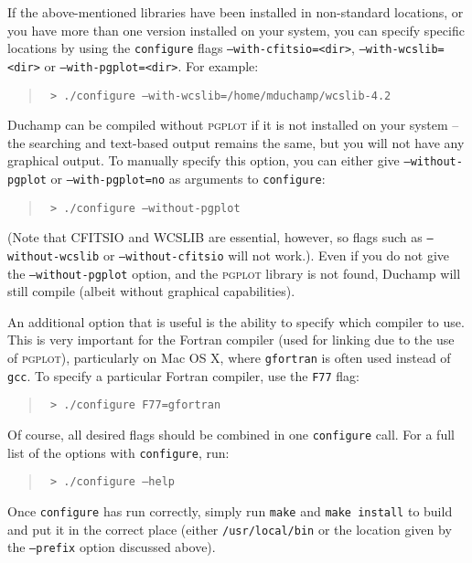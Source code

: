 If the above-mentioned libraries have been installed in non-standard
locations, or you have more than one version installed on your system,
you can specify specific locations by using the \texttt{configure} flags
\texttt{--with-cfitsio=<dir>}, \texttt{--with-wcslib=<dir>} or
\texttt{--with-pgplot=<dir>}. For example:
\begin{quote}
{\footnotesize
\texttt{%
> ./configure --with-wcslib=/home/mduchamp/wcslib-4.2}
}
\end{quote}

Duchamp can be compiled without \textsc{pgplot} if it is not installed
on your system -- the searching and text-based output remains the
same, but you will not have any graphical output.  To manually specify
this option, you can either give \texttt{--without-pgplot} or
\texttt{--with-pgplot=no} as arguments to \texttt{configure}:
\begin{quote}
{\footnotesize
\texttt{%
> ./configure --without-pgplot}
}
\end{quote}

(Note that CFITSIO and WCSLIB are essential, however, so flags such as
\texttt{--without-wcslib} or \texttt{--without-cfitsio} will not
work.).  Even if you do not give the \texttt{--without-pgplot} option,
and the \textsc{pgplot} library is not found, Duchamp will still
compile (albeit without graphical capabilities).

An additional option that is useful is the ability to specify which
compiler to use. This is very important for the Fortran compiler (used
for linking due to the use of \textsc{pgplot}), particularly on Mac OS
X, where \texttt{gfortran} is often used instead of \texttt{gcc}. To
specify a particular Fortran compiler, use the \texttt{F77} flag:
\begin{quote}
{\footnotesize
\texttt{%
> ./configure F77=gfortran}
}
\end{quote}

Of course, all desired flags should be combined in one
\texttt{configure} call. For a full list of the options with
\texttt{configure}, run:
\begin{quote}
{\footnotesize
\texttt{%
> ./configure --help}
}
\end{quote}
Once \texttt{configure} has run correctly, simply run \texttt{make}
and \texttt{make install} to build \duchamp and put it in the correct
place (either \texttt{/usr/local/bin} or the location given by the
\texttt{--prefix} option discussed above).


